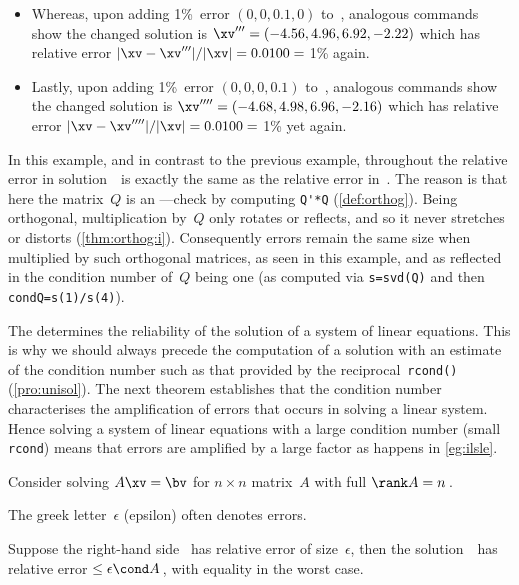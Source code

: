 \begin{example}
\begin{solution}
\begin{itemize}
\item Whereas, upon adding 1\%~error \((0,0,0.1,0)\) to~\bv, analogous commands show the changed solution is \(\xv'''=(-4.56,4.96,6.92,-2.22)\) which has relative error \(|\xv-\xv'''|/|\xv|=0.0100={}\)1\% again.

\item Lastly, upon adding 1\%~error \((0,0,0,0.1)\) to~\bv, analogous commands show the changed solution is \(\xv''''=(-4.68,4.98,6.96,-2.16)\) which has relative error \(|\xv-\xv''''|/|\xv|=0.0100={}\)1\% yet again.

\end{itemize}
In this example, and in contrast to the previous example, throughout the relative error in solution~\xv\ is exactly the same as the relative error in~\bv.
The reason is that here the matrix~\(Q\) is an ---check by computing \verb|Q'*Q| (\autoref{def:orthog}).
Being orthogonal, multiplication by~\(Q\) only rotates or reflects, and so it never stretches or distorts (\autoref{thm:orthog:i}).
Consequently errors remain the same size when multiplied by such orthogonal matrices, as seen in this example, and as reflected in the condition number of~\(Q\) being one (as computed via \verb|s=svd(Q)| and then \verb|condQ=s(1)/s(4)|).
\end{solution}
\end{example}





The  determines the reliability of the solution of a system of linear equations.
This is why we should always precede the computation of a solution with an estimate of the condition number such as that provided by the reciprocal~\verb|rcond()| (\autoref{pro:unisol}). 
The next theorem establishes that the condition number characterises the amplification of errors that occurs in solving a linear system.
Hence solving a system of linear equations with a large condition number (small \verb|rcond|) means that errors are amplified by a large factor as happens in \autoref{eg:ilsle}.

\begin{theorem} \label{thm:erramp}
Consider solving \(A\xv=\bv\) for \(n\times n\) matrix~\(A\) with full \(\rank A=n\)\,.  
\begin{aside}
The greek letter~\(\epsilon\) (epsilon) often denotes errors.
\end{aside}%
Suppose the right-hand side \bv~has relative error of size~\(\epsilon\), then the solution~\xv\ has relative error\({}\leq\epsilon\cond A\)\,, with equality in the worst case.
\end{theorem}

